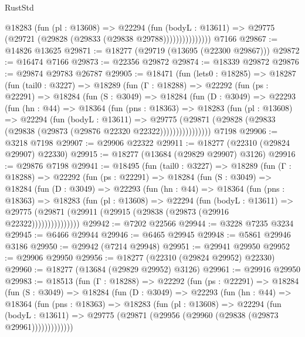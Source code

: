 \begin{lexlean}{RustStd}
\begin{coremodule}
                    @18283
                      (fun (pl : @13608) =>
                      @22294
                        (fun (bodyL : @13611) =>
                        @29775 (@29721 (@29828 (@29833 (@29838 @29788)))))))))))))))
    @7166
@29867 := @14826 @13625
@29871 := @18277 (@29719 (@13695 (@22300 @29867)))
@29872 := @16474 @7166
@29873 := @22356 @29872
@29874 := @18339 @29872
@29876 := @29874 @29783 @26787
@29905 := @18471
    (fun (lets0 : @18285) =>
    @18287
      (fun (tail0 : @3227) =>
      @18289
        (fun (Γ : @18288) =>
        @22292
          (fun (ps : @22291) =>
          @18284
            (fun (S : @3049) =>
            @18284
              (fun (D : @3049) =>
              @22293
                (fun (hn : @44) =>
                @18364
                  (fun (pns : @18363) =>
                  @18283
                    (fun (pl : @13608) =>
                    @22294
                      (fun (bodyL : @13611) =>
                      @29775
                        (@29871
                          (@29828 (@29833 (@29838 (@29873 (@29876 @22320 @22322))))))))))))))))
    @7198
@29906 := @3218 @7198
@29907 := @29906 @22322
@29911 := @18277 (@22310 (@29824 @29907) @22330)
@29915 := @18277 (@13684 (@29829 @29907) @3126)
@29916 := @29876 @7198
@29941 := @18495
    (fun (tail0 : @3227) =>
    @18289
      (fun (Γ : @18288) =>
      @22292
        (fun (ps : @22291) =>
        @18284
          (fun (S : @3049) =>
          @18284
            (fun (D : @3049) =>
            @22293
              (fun (hn : @44) =>
              @18364
                (fun (pns : @18363) =>
                @18283
                  (fun (pl : @13608) =>
                  @22294
                    (fun (bodyL : @13611) =>
                    @29775 (@29871 (@29911 (@29915 (@29838 (@29873 (@29916 @22322)))))))))))))))
@29942 := @7202 @22566
@29944 := @3228 @7235 @3234
@29945 := @6466 @29944
@29946 := @6465 @29945
@29948 := @5861 @29946 @3186
@29950 := @29942 (@7214 @29948)
@29951 := @29941 @29950
@29952 := @29906 @29950
@29956 := @18277 (@22310 (@29824 @29952) @22330)
@29960 := @18277 (@13684 (@29829 @29952) @3126)
@29961 := @29916 @29950
@29983 := @18513
    (fun (Γ : @18288) =>
    @22292
      (fun (ps : @22291) =>
      @18284
        (fun (S : @3049) =>
        @18284
          (fun (D : @3049) =>
          @22293
            (fun (hn : @44) =>
            @18364
              (fun (pns : @18363) =>
              @18283
                (fun (pl : @13608) =>
                @22294
                  (fun (bodyL : @13611) =>
                  @29775 (@29871 (@29956 (@29960 (@29838 (@29873 @29961)))))))))))))

\end{coremodule}
\end{lexlean}
